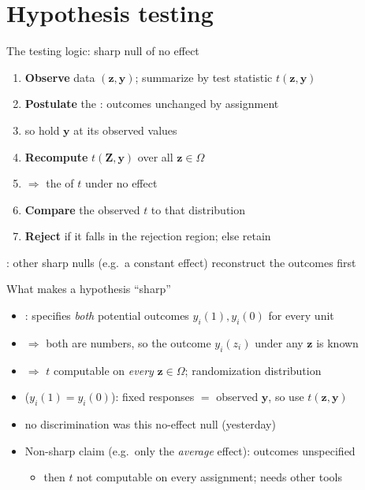 \documentclass[table, xcolor = {dvipsnames}, 9pt]{beamer}
\theoremstyle{plain}
\newcommand{\mh}[1]{{\color{magenta}{#1}}}
\begin{document}
\section{Hypothesis testing}
\begin{frame}[t]{The testing logic: sharp null of no effect}
\vfill
\begin{enumerate} \vfill
\item \textbf{Observe} data $(\bm{z}, \bm{y})$; summarize by test statistic $t(\bm{z}, \bm{y})$ \vfill
\item \textbf{Postulate} the \mh{sharp null of no effect}: outcomes unchanged by assignment \vfill
\item[] so hold $\bm{y}$ \mh{fixed} at its observed values \vfill
\item \textbf{Recompute} $t(\bm{Z}, \bm{y})$ over all $\bm{z} \in \Omega$ \vfill
\item[] $\Rightarrow$ the \mh{randomization distribution} of $t$ under no effect \vfill
\item \textbf{Compare} the observed $t$ to that distribution \vfill
\item \textbf{Reject} if it falls in the rejection region; else retain \vfill
\end{enumerate} \vfill
\mh{Later}: other sharp nulls (e.g.\ a constant effect) reconstruct the outcomes first
\vfill
\end{frame}
\begin{frame}[t]{What makes a hypothesis ``sharp''}
\vfill
\begin{itemize} \vfill
\item \mh{Sharp null}: specifies \emph{both} potential outcomes $y_i(1), y_i(0)$ for every unit \vfill
\item[] $\Rightarrow$ both are \mh{fixed} numbers, so the outcome $y_i(z_i)$ under any $\bm{z}$ is known \vfill
\item[] $\Rightarrow$ $t$ computable on \emph{every} $\bm{z} \in \Omega$; randomization distribution \mh{known} \vfill
\item \mh{No effect} ($y_i(1) = y_i(0)$): fixed responses $=$ observed $\bm{y}$, so use $t(\bm{z}, \bm{y})$ \vfill
\item[] no discrimination was this no-effect null (yesterday) \vfill
\item Non-sharp claim (e.g.\ only the \emph{average} effect): outcomes unspecified \vfill
\begin{itemize} \vfill
\item[$\star$] then $t$ not computable on every assignment; needs other tools \vfill
\end{itemize} \vfill
\end{itemize} \vfill
\end{frame}
\end{document}
